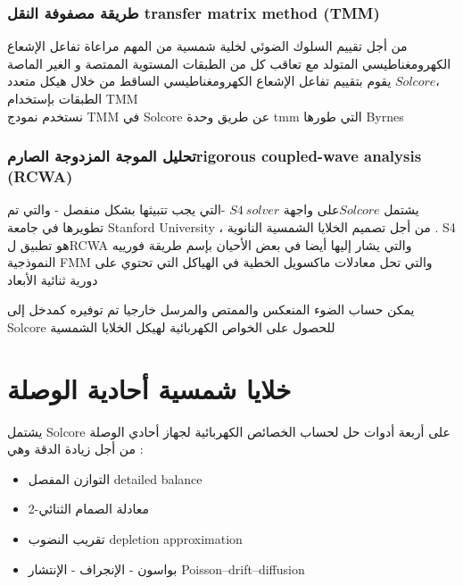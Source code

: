 \subsubsection{ طريقة مصفوفة النقل transfer matrix method (TMM)}

من أجل تقييم  السلوك الضوئي لخلية شمسية من المهم مراعاة تفاعل الإشعاع الكهرومغناطيسي المتولد مع تعاقب كل من الطبقات المستوية  الممتصة و الغير الماصة ،$ Solcore  $ يقوم بتقييم تفاعل الإشعاع الكهرومغناطيسي الساقط من خلال هيكل متعدد الطبقات بإستخدام TMM  \\
نستخدم نمودج TMM  في Solcore عن طريق وحدة tmm التي طورها Byrnes  
\subsubsection{   تحليل الموجة المزدوجة الصارمrigorous coupled-wave analysis (RCWA) }

يشتمل $ Solcore  $على واجهة $ S4~ solver  $  -التي يجب تتبيثها بشكل منفصل - والتي تم تطويرها في جامعة Stanford University ، من أجل تصميم الخلايا الشمسية النانوية . S4 هو تطبيق لRCWA والتي يشار إليها أيضا في بعض الأحيان بإسم طريقة فورييه النموذجية FMM  والتي تحل معادلات ماكسويل الخطية  في الهياكل التي تحتوي على دورية ثنائية الأبعاد 

يمكن حساب الضوء المنعكس والممتص والمرسل خارجيا تم توفيره كمدخل إلى Solcore  للحصول على الخواص الكهربائية لهيكل الخلايا الشمسية 
\section{ خلايا شمسية أحادية الوصلة} 
يشتمل  Solcore على أربعة أدوات حل لحساب الخصائص الكهربائية لجهاز أحادي الوصلة من أجل زيادة الدقة وهي :
\begin{itemize}
	\item  التوازن المفصل detailed balance
	\item 2-معادلة الصمام الثنائي 
	\item تقريب النضوب depletion approximation
	\item بواسون - الإنجراف - الإنتشار  Poisson–drift–diffusion
\end{itemize}

